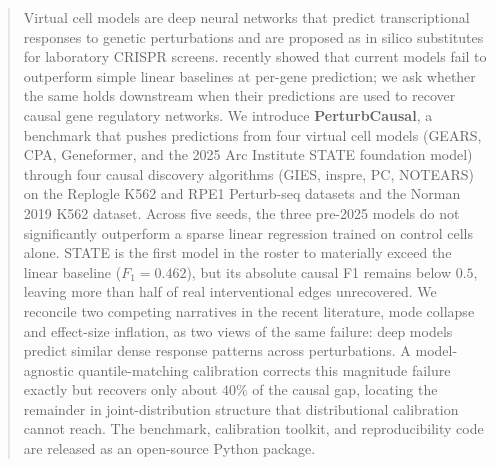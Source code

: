 \documentclass{article}
\begin{document}

\printAffiliationsAndNotice{}

\begin{abstract}
Virtual cell models are deep neural networks that predict transcriptional responses to genetic perturbations and are proposed as in silico substitutes for laboratory CRISPR screens.
\citet{ahlmanneltze2025} recently showed that current models fail to outperform simple linear baselines at per-gene prediction; we ask whether the same holds downstream when their predictions are used to recover causal gene regulatory networks.
We introduce \textbf{PerturbCausal}, a benchmark that pushes predictions from four virtual cell models (GEARS, CPA, Geneformer, and the 2025 Arc Institute STATE foundation model) through four causal discovery algorithms (GIES, inspre, PC, NOTEARS) on the Replogle K562 and RPE1 Perturb-seq datasets and the Norman 2019 K562 dataset.
Across five seeds, the three pre-2025 models do not significantly outperform a sparse linear regression trained on control cells alone.
STATE is the first model in the roster to materially exceed the linear baseline ($F_1 = 0.462$), but its absolute causal F1 remains below $0.5$, leaving more than half of real interventional edges unrecovered.
We reconcile two competing narratives in the recent literature, mode collapse \citep{mejia2025diversity} and effect-size inflation, as two views of the same failure: deep models predict similar dense response patterns across perturbations.
A model-agnostic quantile-matching calibration corrects this magnitude failure exactly but recovers only about $40\%$ of the causal gap, locating the remainder in joint-distribution structure that distributional calibration cannot reach.
The benchmark, calibration toolkit, and reproducibility code are released as an open-source Python package.
\end{abstract}
\end{document}
